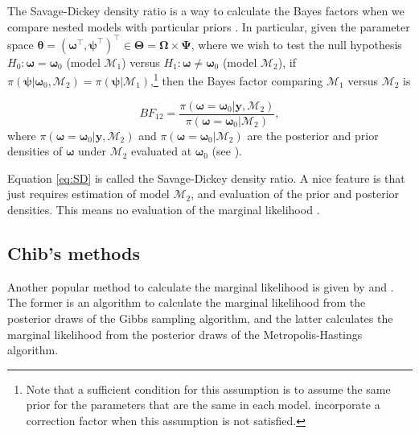 The Savage-Dickey density ratio is a way to calculate the Bayes factors when we compare nested models with particular priors \cite{dickey1971weighted,verdinelli1995computing}. In particular, given the parameter space $\bm{\theta}=(\bm{\omega}^{\top}, \bm{\psi}^{\top})^{\top}\in \bm{\Theta}=\bm{\Omega}\times \bm{\Psi}$, where we wish to test the null hypothesis $H_0:\bm{\omega}=\bm{\omega}_0$ (model $\mathcal{M}_1$) versus $H_1:\bm{\omega}\neq \bm{\omega}_0$ (model $\mathcal{M}_2$), if $\pi(\bm{\psi}|\bm{\omega}_0,\mathcal{M}_2)=\pi(\bm{\psi}|\mathcal{M}_1)$,\footnote{Note that a sufficient condition for this assumption is to assume the same prior for the parameters that are the same in each model. \cite{verdinelli1995computing} incorporate a correction factor when this assumption is not satisfied.} then the Bayes factor comparing $\mathcal{M}_1$ versus $\mathcal{M}_2$ is

\begin{equation}\label{eq:SD}
	BF_{12}=\frac{\pi(\bm{\omega}=\bm{\omega}_0|\bm{y},\mathcal{M}_2)}{\pi(\bm{\omega}=\bm{\omega}_0|\mathcal{M}_2)},
\end{equation}
where $\pi(\bm{\omega}=\bm{\omega}_0|\bm{y},\mathcal{M}_2)$ and $\pi(\bm{\omega}=\bm{\omega}_0|\mathcal{M}_2)$ are the posterior and prior densities of $\bm{\omega}$ under $\mathcal{M}_2$ evaluated at $\bm{\omega}_0$ (see \cite{verdinelli1995computing}). 

Equation \ref{eq:SD} is called the Savage-Dickey density ratio. A nice feature is that just requires estimation of model $\mathcal{M}_2$, and evaluation of the prior and posterior densities. This means no evaluation of the marginal likelihood \cite[Chap.~4]{koop2003bayesian}.\\

\subsection{Chib's methods}\label{sec10_4_2}

Another popular method to calculate the marginal likelihood is given by \cite{chib1995marginal} and \cite{chib2001marginal}. The former is an algorithm to calculate the marginal likelihood from the posterior draws of the Gibbs sampling algorithm, and the latter calculates the marginal likelihood from the posterior draws of the Metropolis-Hastings algorithm.

